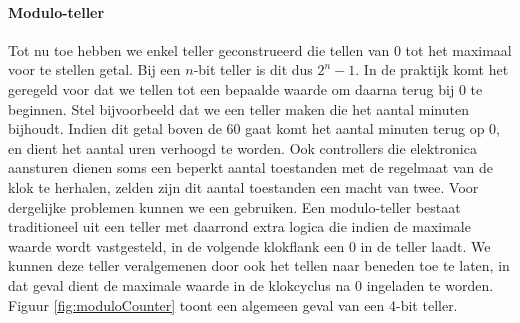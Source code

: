 \paragraph{Modulo-teller}Tot nu toe hebben we enkel teller geconstrueerd die tellen van 0 tot het maximaal voor te stellen getal. Bij een $n$-bit teller is dit dus $2^n-1$. In de praktijk komt het geregeld voor dat we tellen tot een bepaalde waarde om daarna terug bij 0 te beginnen. Stel bijvoorbeeld dat we een teller maken die het aantal minuten bijhoudt. Indien dit getal boven de 60 gaat komt het aantal minuten terug op 0, en dient het aantal uren verhoogd te worden. Ook controllers die elektronica aansturen dienen soms een beperkt aantal toestanden met de regelmaat van de klok te herhalen, zelden zijn dit aantal toestanden een macht van twee. Voor dergelijke problemen kunnen we een  gebruiken. Een modulo-teller bestaat traditioneel uit een teller met daarrond extra logica die indien de maximale waarde wordt vastgesteld, in de volgende klokflank een 0 in de teller laadt. We kunnen deze teller veralgemenen door ook het tellen naar beneden toe te laten, in dat geval dient de maximale waarde in de klokcyclus na 0 ingeladen te worden. Figuur \ref{fig:moduloCounter} toont een algemeen geval van een 4-bit teller.
